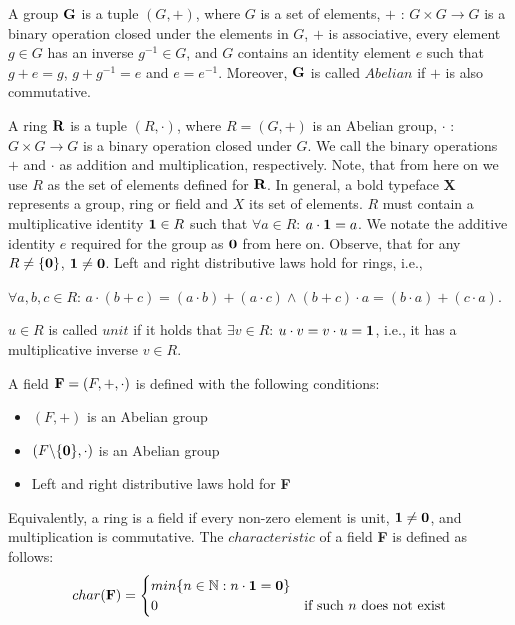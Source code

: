 A group $\textbf G$ is a tuple $(G, +)$, where $G$ is a set of elements, $+$ : $G \times G \longrightarrow G$ is a binary operation closed under 
the elements in $G$, $+$ is associative, every element $g\in G$ has an inverse $g^{-1}\in G$, and $G$ contains 
an identity element $e$ such that $g + e = g$, $g + g^{-1} = e$ and $e = e^{-1}$. Moreover, $\textbf G$ is called $Abelian$ if 
$+$ is also commutative.\nl

A ring $\textbf R$ is a tuple $(R, \cdot )$, where $R = (G, +)$ is an Abelian group, $\cdot$ : $G \times G \longrightarrow G$ 
is a binary operation closed under $G$. We call the binary operations $+$ and $\cdot$ as addition and multiplication, respectively. 
Note, that from here on we use $R$ as the set of elements defined for $\textbf R$. 
In general, a bold typeface \textbf X represents a group, ring or field and $X$ its set of elements. 
$R$ must contain a multiplicative identity $\textbf 1 \in R$ such that $\forall a \in R$: $a \cdot \textbf 1 = a$. 
We notate the additive identity $e$ required for the group as $\textbf 0$ from here on. 
Observe, that for any $R \neq \{\textbf 0\}$, $\textbf 1 \neq \textbf 0$.  
Left and right distributive laws hold for rings, i.e., 
\begin{center}
  $\forall a, b, c \in R$: $a \cdot (b + c) = (a \cdot b) + (a \cdot c) \land (b + c) \cdot a = (b \cdot a) + (c \cdot a)$.
\end{center}
$u \in R$ is called $unit$ if it holds that $\exists v \in R$: $u \cdot v = v \cdot u = \textbf 1$, 
i.e., it has a multiplicative inverse $v \in R$.\nl

A field $\textbf F = (F, +, \cdot)$ is defined with the following conditions:
\begin{itemize}
  \item $(F, +)$ is an Abelian group
  \item $(F\backslash \{\textbf 0\}, \cdot )$ is an Abelian group
  \item Left and right distributive laws hold for \textbf F
\end{itemize}

Equivalently, a ring is a field if every non-zero element is unit, $\textbf 1 \neq \textbf 0$, and multiplication is commutative. 
The $characteristic$ of a field \textbf F is defined as follows:
  \begin{equation}
    char(\textbf F) =
      \begin{cases}
        min\{n \in \mathbb N : n \cdot \textbf 1 = \textbf 0 \}\\
        0 & \text{if such $n$ does not exist}\\
      \end{cases}       
  \end{equation}

